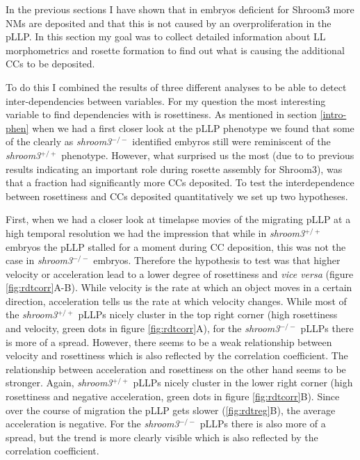 \documentclass[11pt,singlespacinge,twoside]{reedthesis} %
\theoremstyle{definition}
\theoremstyle{definition}
\theoremstyle{definition}
\theoremstyle{remark}
\begin{document}
In the previous sections I have shown that in embryos deficient for Shroom3 more NMs are deposited and that this is not caused by an overproliferation in the pLLP. In this section my goal was to collect detailed information about LL morphometrics and rosette formation to find out what is causing the additional CCs to be deposited.

To do this I combined the results of three different analyses to be able to detect inter-dependencies between variables. For my question the most interesting variable to find dependencies with is rosettiness. As mentioned in section \ref{intro-phen} when we had a first closer look at the pLLP phenotype we found that some of the clearly as \emph{shroom3}\(^{-/-}\) identified embyros still were reminiscent of the \emph{shroom3}\(^{+/+}\) phenotype. However, what surprised us the most (due to to previous results indicating an important role during rosette assembly for Shroom3), was that a fraction had significantly more CCs deposited. To test the interdependence between rosettiness and CCs deposited quantitatively we set up two hypotheses.

First, when we had a closer look at timelapse movies of the migrating pLLP at a high temporal resolution we had the impression that while in \emph{shroom3}\(^{+/+}\) embryos the pLLP stalled for a moment during CC deposition, this was not the case in \emph{shroom3}\(^{-/-}\) embryos. Therefore the hypothesis to test was that higher velocity or acceleration lead to a lower degree of rosettiness and \emph{vice versa} (figure \ref{fig:rdtcorr}A-B). While velocity is the rate at which an object moves in a certain direction, acceleration tells us the rate at which velocity changes. While most of the \emph{shroom3}\(^{+/+}\) pLLPs nicely cluster in the top right corner (high rosettiness and velocity, green dots in figure \ref{fig:rdtcorr}A), for the \emph{shroom3}\(^{-/-}\) pLLPs there is more of a spread. However, there seems to be a weak relationship between velocity and rosettiness which is also reflected by the correlation coefficient. The relationship between acceleration and rosettiness on the other hand seems to be stronger. Again, \emph{shroom3}\(^{+/+}\) pLLPs nicely cluster in the lower right corner (high rosettiness and negative acceleration, green dots in figure \ref{fig:rdtcorr}B). Since over the course of migration the pLLP gets slower (\ref{fig:rdtreg}B), the average acceleration is negative. For the \emph{shroom3}\(^{-/-}\) pLLPs there is also more of a spread, but the trend is more clearly visible which is also reflected by the correlation coefficient.
\end{document}
